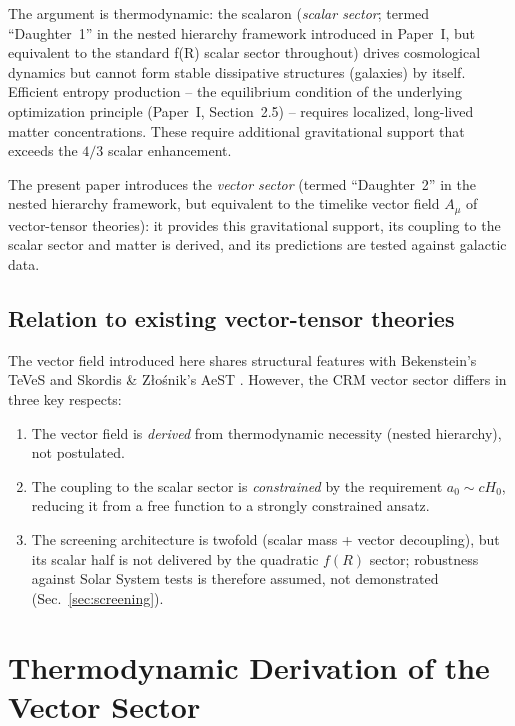 \documentclass[aps,prd,twocolumn,superscriptaddress,nofootinbib]{revtex4-2}
\begin{document}
The argument is thermodynamic: the scalaron (\textit{scalar sector}; termed ``Daughter~1'' in the nested hierarchy framework introduced in Paper~I, but equivalent to the standard f(R) scalar sector throughout) drives cosmological dynamics but cannot form stable dissipative structures (galaxies) by itself. Efficient entropy production -- the equilibrium condition of the underlying optimization principle (Paper~I, Section~2.5) -- requires localized, long-lived matter concentrations. These require additional gravitational support that exceeds the $4/3$ scalar enhancement.

The present paper introduces the \textit{vector sector} (termed ``Daughter~2'' in the nested hierarchy framework, but equivalent to the timelike vector field $A_\mu$ of vector-tensor theories): it provides this gravitational support, its coupling to the scalar sector and matter is derived, and its predictions are tested against galactic data.

\subsection{Relation to existing vector-tensor theories}

The vector field introduced here shares structural features with Bekenstein's TeVeS \cite{Bekenstein2004} and Skordis \& Z{\l}o\'snik's AeST \cite{Skordis2021}. However, the CRM vector sector differs in three key respects:
\begin{enumerate}
\item The vector field is \textit{derived} from thermodynamic necessity (nested hierarchy), not postulated.
\item The coupling to the scalar sector is \textit{constrained} by the requirement $a_0 \sim cH_0$, reducing it from a free function to a strongly constrained ansatz.
\item The screening architecture is twofold (scalar mass + vector decoupling), but its scalar half is not delivered by the quadratic $f(R)$ sector; robustness against Solar System tests is therefore assumed, not demonstrated (Sec.~\ref{sec:screening}).
\end{enumerate}


\section{Thermodynamic Derivation of the Vector Sector}
\label{sec:derivation}
\end{document}
